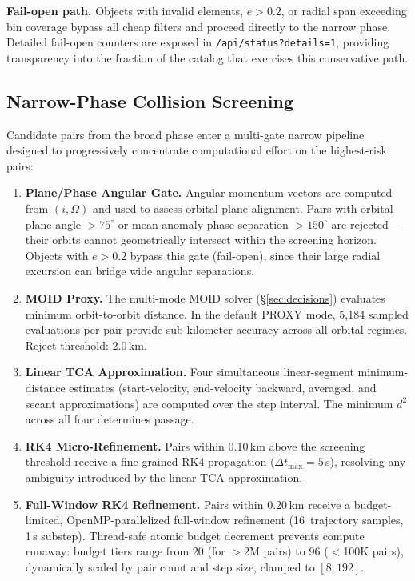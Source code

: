 \documentclass[10pt,twocolumn,letterpaper]{article}
\begin{document}
\noindent
\textbf{Fail-open path.}  Objects with invalid elements,
$e > 0.2$, or radial span exceeding bin coverage bypass all cheap filters
and proceed directly to the narrow phase.  Detailed fail-open counters
are exposed in \texttt{/api/status?details=1}, providing transparency
into the fraction of the catalog that exercises this conservative path.

\subsection{Narrow-Phase Collision Screening}

Candidate pairs from the broad phase enter a multi-gate narrow pipeline
designed to progressively concentrate computational effort on the
highest-risk pairs:

\begin{enumerate}[nosep,leftmargin=*]
  \item \textbf{Plane/Phase Angular Gate.}
    Angular momentum vectors are computed from $(i, \Omega)$ and used to
    assess orbital plane alignment.  Pairs with orbital plane angle
    $> 75^{\circ}$ or mean anomaly phase separation $> 150^{\circ}$ are
    rejected---their orbits cannot geometrically intersect within the
    screening horizon.  Objects with $e > 0.2$ bypass this gate
    (fail-open), since their large radial excursion can bridge wide
    angular separations.

  \item \textbf{MOID Proxy.}
    The multi-mode MOID solver (\S\ref{sec:decisions}) evaluates minimum
    orbit-to-orbit distance.  In the default PROXY mode, 5{,}184 sampled
    evaluations per pair provide sub-kilometer accuracy across all orbital
    regimes.  Reject threshold: 2.0\,km.

  \item \textbf{Linear TCA Approximation.}
    Four simultaneous linear-segment minimum-distance estimates
    (start-velocity, end-velocity backward, averaged, and secant
    approximations) are computed over the step interval.
    The minimum $d^2$ across all four determines passage.

  \item \textbf{RK4 Micro-Refinement.}
    Pairs within 0.10\,km above the screening threshold receive a
    fine-grained RK4 propagation ($\Delta t_{\max} = 5$\,s), resolving
    any ambiguity introduced by the linear TCA approximation.

  \item \textbf{Full-Window RK4 Refinement.}
    Pairs within 0.20\,km receive a budget-limited, OpenMP-parallelized
    full-window refinement (16~trajectory samples, 1\,s substep).
    Thread-safe atomic budget decrement prevents compute runaway:
    budget tiers range from 20 (for $>$2M pairs) to 96 ($<$100K pairs),
    dynamically scaled by pair count and step size, clamped to $[8, 192]$.
\end{enumerate}
\end{document}
